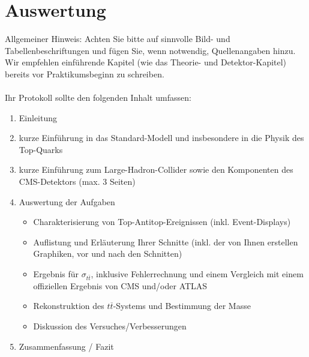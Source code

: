 \section{Auswertung}
\label{prot}
Allgemeiner Hinweis: Achten Sie bitte auf sinnvolle Bild- und Tabellenbeschriftungen und f\"ugen Sie, wenn notwendig, Quellenangaben hinzu. Wir empfehlen einf\"uhrende Kapitel (wie das Theorie- und Detektor-Kapitel) bereits vor Praktikumsbeginn zu schreiben.\\
\\
Ihr Protokoll sollte den folgenden Inhalt umfassen:
\begin{enumerate}
	\item Einleitung
	\item kurze Einf\"uhrung in das Standard-Modell und insbesondere in die Physik des Top-Quarks
	\item kurze Einf\"uhrung zum Large-Hadron-Collider sowie den Komponenten des CMS-Detektors (max. 3 Seiten)
	\item Auswertung der Aufgaben
	\begin{itemize}
		\item Charakterisierung von Top-Antitop-Ereignissen (inkl. Event-Displays)
		\item Auflistung und Erl\"auterung Ihrer Schnitte (inkl. der von Ihnen erstellen Graphiken, vor und nach den Schnitten)
		\item Ergebnis f\"ur $\sigma_{t\bar{t}}$, inklusive Fehlerrechnung und einem Vergleich mit einem offiziellen Ergebnis von CMS und/oder ATLAS
                \item Rekonstruktion des $t\overline{t}$-Systems und Bestimmung der Masse
                \item Diskussion des Versuches/Verbesserungen 
       \end{itemize}
	\item Zusammenfassung / Fazit
\end{enumerate}